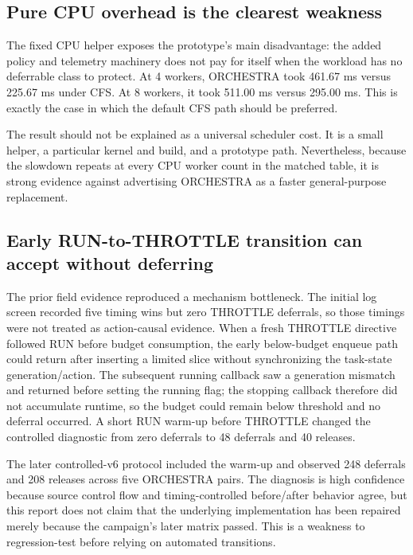 \documentclass[10pt,letterpaper,twocolumn]{article}
\begin{document}
\subsection{Pure CPU overhead is the clearest weakness}

The fixed CPU helper exposes the prototype's main disadvantage: the added policy and telemetry machinery does not pay for itself when the workload has no deferrable class to protect. At 4 workers, ORCHESTRA took 461.67 ms versus 225.67 ms under CFS. At 8 workers, it took 511.00 ms versus 295.00 ms. This is exactly the case in which the default CFS path should be preferred.

The result should not be explained as a universal scheduler cost. It is a small helper, a particular kernel and build, and a prototype path. Nevertheless, because the slowdown repeats at every CPU worker count in the matched table, it is strong evidence against advertising ORCHESTRA as a faster general-purpose replacement.

\subsection{Early RUN-to-THROTTLE transition can accept without deferring}

The prior field evidence reproduced a mechanism bottleneck. The initial log screen recorded five timing wins but zero THROTTLE deferrals, so those timings were not treated as action-causal evidence. When a fresh THROTTLE directive followed RUN before budget consumption, the early below-budget enqueue path could return after inserting a limited slice without synchronizing the task-state generation/action. The subsequent running callback saw a generation mismatch and returned before setting the running flag; the stopping callback therefore did not accumulate runtime, so the budget could remain below threshold and no deferral occurred. A short RUN warm-up before THROTTLE changed the controlled diagnostic from zero deferrals to 48 deferrals and 40 releases.

The later controlled-v6 protocol included the warm-up and observed 248 deferrals and 208 releases across five ORCHESTRA pairs. The diagnosis is high confidence because source control flow and timing-controlled before/after behavior agree, but this report does not claim that the underlying implementation has been repaired merely because the campaign's later matrix passed. This is a weakness to regression-test before relying on automated transitions.
\end{document}
